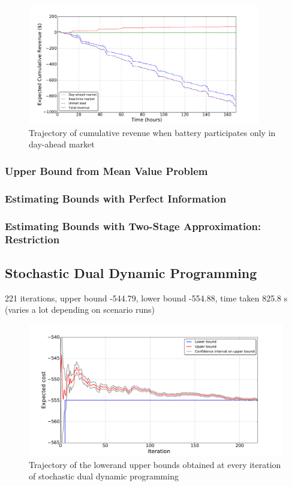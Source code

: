 \documentclass[11pt,twoside]{article}
\begin{document}
\begin{figure}[h!]
\begin{center}
\includegraphics[width=4in]
{Figures/Plots/onlydam/cumulative_rev_fp_st.pdf} \caption{Trajectory of cumulative revenue when battery participates only in day-ahead market}\label{fig:cumulative_rev_onlydam}\end{center}
\end{figure}


\subsubsection{Upper Bound from Mean Value Problem}


\subsubsection{Estimating Bounds with Perfect Information}
\subsubsection{Estimating Bounds with Two-Stage 	Approximation: Restriction}
 
\subsection{Stochastic Dual Dynamic Programming}
221 iterations, upper bound -544.79, lower bound -554.88, time taken 825.8 s (varies a lot depending on scenario runs)
\begin{figure}[h!]
\begin{center}
\includegraphics[scale=0.4]
{Figures/Plots/dualdynamic/bounds.pdf} \caption{Trajectory of the lowerand upper bounds obtained at every iteration of stochastic dual dynamic programming}\label{fig:bounds}\end{center}
\end{figure}
\FloatBarrier
\end{document}
